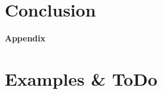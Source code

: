 \chapter{Conclusion}
\label{chap:conclusion}




\appendix	%

\clearforchapter
\begin{vplace}[0.7]
\begin{center}
\Huge \textbf{Appendix}
\end{center}
\end{vplace}








\chapter{Examples \& ToDo}

\clearpage
\listoftodos
